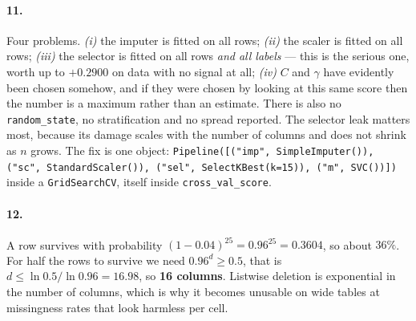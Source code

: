\documentclass[11pt]{article}
\begin{document}
\paragraph{11.} Four problems. \emph{(i)} the imputer is fitted on all rows;
\emph{(ii)} the scaler is fitted on all rows; \emph{(iii)} the selector is
fitted on all rows \emph{and all labels} --- this is the serious one, worth
up to $+0.2900$ on data with no signal at all; \emph{(iv)} $C$ and
$\gamma$ have evidently been chosen somehow, and if they were chosen by
looking at this same score then the number is a maximum rather than an
estimate. There is also no \texttt{random\_state}, no stratification and no
spread reported. The selector leak matters most, because its damage scales
with the number of columns and does not shrink as $n$ grows.
The fix is one object:
\texttt{Pipeline([("imp", SimpleImputer()), ("sc", StandardScaler()),
("sel", SelectKBest(k=15)), ("m", SVC())])} inside a
\texttt{GridSearchCV}, itself inside \texttt{cross\_val\_score}.

\paragraph{12.} A row survives with probability $(1 - 0.04)^{25} =
0.96^{25} = 0.3604$, so about $36\%$. For half the rows to survive we need
$0.96^{d} \geq 0.5$, that is $d \leq \ln 0.5 / \ln 0.96 = 16.98$, so
\textbf{16 columns}. Listwise deletion is exponential in the number of
columns, which is why it becomes unusable on wide tables at missingness rates
that look harmless per cell.
\end{document}
